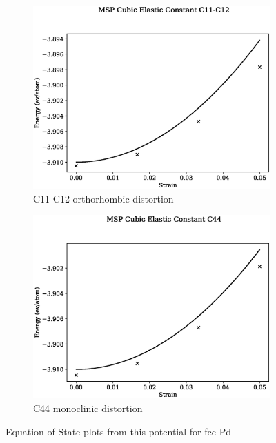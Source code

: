 \begin{figure}[htb]
\begin{subfigure}{.42\textwidth}
  \centering
  \includegraphics[width=.90\linewidth]{chapters/potentials_fe_pd_ru/fepd_potential/ec_mskp/msp_c11_c12_plot_bp_2.eps}  
  \caption{C11-C12 orthorhombic distortion}
  \label{fig:fepd-pdfcc-c11c12}
\end{subfigure}
\begin{subfigure}{.42\textwidth}
  \centering
  \includegraphics[width=.90\linewidth]{chapters/potentials_fe_pd_ru/fepd_potential/ec_mskp/msp_c44_plot_bp_2.eps}  
  \caption{C44 monoclinic distortion}
  \label{fig:fepd-pdfcc-c44}
\end{subfigure}
\label{fig:fepd-fefcc-c11c12c44}
\caption{Equation of State plots from this potential for \acrshort{fcc} Pd}
\end{figure}



